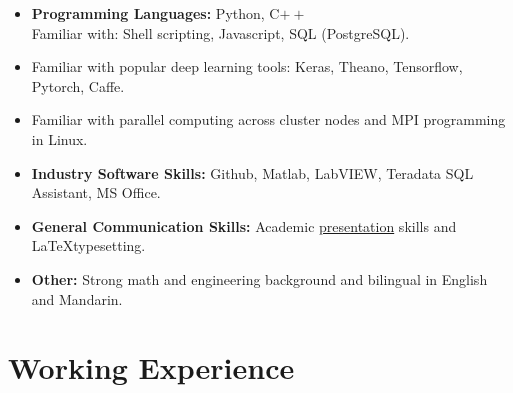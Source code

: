 \documentclass[11pt,a4paper,geogia]{moderncv}        %
\begin{document}
	\begin{itemize}
		
		\item \textbf{Programming Languages:} Python, C$++$ \\ Familiar with: Shell scripting, Javascript, SQL (PostgreSQL).
		
		\vspace{6pt}
		
		\item{Familiar with popular deep learning tools: Keras, Theano, Tensorflow, Pytorch, Caffe.}
		
		\vspace{6pt}
		
		\item{Familiar with parallel computing across cluster nodes and MPI programming in Linux.}
		
		\vspace{6pt}
		
		\item \textbf{Industry Software Skills:} Github, Matlab, LabVIEW, Teradata SQL Assistant, MS Office.	
		
		\vspace{6pt}
		
		\item \textbf{General Communication Skills:} Academic \href{https://hma02.github.io/AllanMa/presentations.html}{presentation} skills and \LaTeX\space typesetting.
		
		\vspace{6pt}
		
		\item \textbf{Other:} Strong math and engineering background and bilingual in English and Mandarin.
		
	\end{itemize}
	
	\vspace{2pt}
	
	\section{Working Experience}
	
	\vspace{6pt}
	
\end{document}

